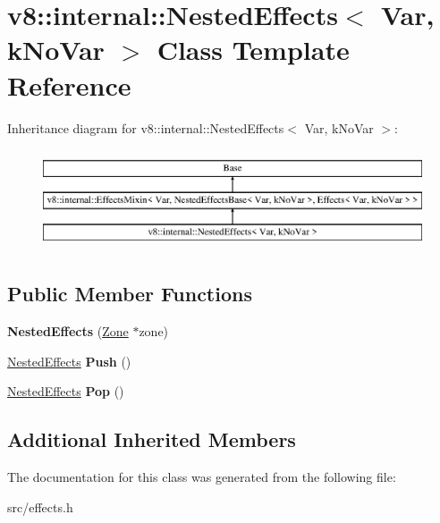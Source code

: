 \hypertarget{classv8_1_1internal_1_1_nested_effects}{}\section{v8\+:\+:internal\+:\+:Nested\+Effects$<$ Var, k\+No\+Var $>$ Class Template Reference}
\label{classv8_1_1internal_1_1_nested_effects}
Inheritance diagram for v8\+:\+:internal\+:\+:Nested\+Effects$<$ Var, k\+No\+Var $>$\+:\begin{figure}[H]
\begin{center}
\leavevmode
\includegraphics[height=3.000000cm]{classv8_1_1internal_1_1_nested_effects}
\end{center}
\end{figure}
\subsection*{Public Member Functions}
\begin{DoxyCompactItemize}
\item 
\hypertarget{classv8_1_1internal_1_1_nested_effects_a61782288c87d67c138458ce48275eb30}{}{\bfseries Nested\+Effects} (\hyperlink{classv8_1_1internal_1_1_zone}{Zone} $\ast$zone)\label{classv8_1_1internal_1_1_nested_effects_a61782288c87d67c138458ce48275eb30}

\item 
\hypertarget{classv8_1_1internal_1_1_nested_effects_a977d8d5567c6f7c5a7f4298ef84d90c6}{}\hyperlink{classv8_1_1internal_1_1_nested_effects}{Nested\+Effects} {\bfseries Push} ()\label{classv8_1_1internal_1_1_nested_effects_a977d8d5567c6f7c5a7f4298ef84d90c6}

\item 
\hypertarget{classv8_1_1internal_1_1_nested_effects_a13e46446fa7db4a0890935520ed812d6}{}\hyperlink{classv8_1_1internal_1_1_nested_effects}{Nested\+Effects} {\bfseries Pop} ()\label{classv8_1_1internal_1_1_nested_effects_a13e46446fa7db4a0890935520ed812d6}

\end{DoxyCompactItemize}
\subsection*{Additional Inherited Members}


The documentation for this class was generated from the following file\+:\begin{DoxyCompactItemize}
\item 
src/effects.\+h\end{DoxyCompactItemize}
